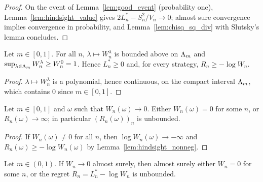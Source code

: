 \begin{proof}
  \leanok
  On the event of Lemma~\ref{lem:good_event} (probability one), Lemma~\ref{lem:hindsight_value}
  gives $2L^*_n - S_n^2/V_n \to 0$; almost sure convergence implies convergence in probability, and
  Lemma~\ref{lem:chisq_sq_div} with Slutsky's lemma concludes.
\end{proof}

\begin{lemma}
  \label{lem:hindsight_nonneg}
  \leanok
  Let $m \in [0,1]$. For all $n$, $\lambda \mapsto W^\lambda_n$ is bounded above on $\Lambda_m$ and
  $\sup_{\lambda \in \Lambda_m} W^\lambda_n \ge W^0_n = 1$. Hence $L^*_n \ge 0$ and, for every strategy,
  $R_n \ge -\log W_n$.
\end{lemma}

\begin{proof}
  \leanok
  $\lambda \mapsto W^\lambda_n$ is a polynomial, hence continuous, on the compact interval $\Lambda_m$,
  which contains $0$ since $m \in [0, 1]$.
\end{proof}

\begin{lemma}
  \label{lem:unbounded_regret_pathwise}
  \leanok
  Let $m \in [0,1]$ and $\omega$ such that $W_n(\omega) \to 0$. Either $W_n(\omega) = 0$ for some
  $n$, or $R_n(\omega) \to \infty$; in particular $(R_n(\omega))_n$ is unbounded.
\end{lemma}

\begin{proof}
  \leanok
  If $W_n(\omega) \ne 0$ for all $n$, then $\log W_n(\omega) \to -\infty$ and
  $R_n(\omega) \ge -\log W_n(\omega)$ by Lemma~\ref{lem:hindsight_nonneg}.
\end{proof}

\begin{theorem}
  \label{thm:unbounded_regret}
  \leanok
  Let $m \in (0,1)$. If $W_n \to 0$ almost surely, then almost surely either $W_n = 0$ for some $n$,
  or the regret $R_n = L^*_n - \log W_n$ is unbounded.
\end{theorem}

